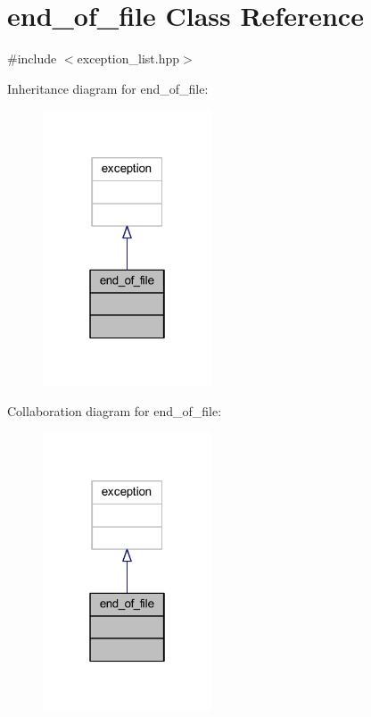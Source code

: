 \hypertarget{classend__of__file}{}\section{end\+\_\+of\+\_\+file Class Reference}
\label{classend__of__file}


{\ttfamily \#include $<$exception\+\_\+list.\+hpp$>$}



Inheritance diagram for end\+\_\+of\+\_\+file\+:
\nopagebreak
\begin{figure}[H]
\begin{center}
\leavevmode
\includegraphics[width=142pt]{classend__of__file__inherit__graph}
\end{center}
\end{figure}


Collaboration diagram for end\+\_\+of\+\_\+file\+:
\nopagebreak
\begin{figure}[H]
\begin{center}
\leavevmode
\includegraphics[width=142pt]{classend__of__file__coll__graph}
\end{center}
\end{figure}


